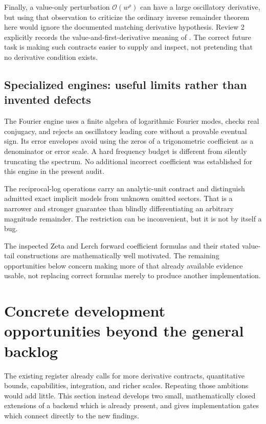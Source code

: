 \documentclass[11pt,a4paper]{article}
\newcommand{\code}[1]{\texttt{\detokenize{#1}}}
\newcommand{\OO}{\mathcal O}
\begin{document}
Finally, a value-only perturbation \(\OO(w^\rho)\) can have a large oscillatory derivative, but using that observation to criticize the ordinary inverse remainder theorem here would ignore the documented matching derivative hypothesis. Review 2 explicitly records the value-and-first-derivative meaning of \code{InputRemainder}. The correct future task is making such contracts easier to supply and inspect, not pretending that no derivative condition exists.\cite{r2}

\subsection{Specialized engines: useful limits rather than invented defects}
The Fourier engine uses a finite algebra of logarithmic Fourier modes, checks real conjugacy, and rejects an oscillatory leading core without a provable eventual sign. Its error envelopes avoid using the zeros of a trigonometric coefficient as a denominator or error scale. A hard frequency budget is different from silently truncating the spectrum. No additional incorrect coefficient was established for this engine in the present audit.\cite{fourier}

The reciprocal-log operations carry an analytic-unit contract and distinguish admitted exact implicit models from unknown omitted sectors. That is a narrower and stronger guarantee than blindly differentiating an arbitrary magnitude remainder. The restriction can be inconvenient, but it is not by itself a bug.\cite{reciprocal}

The inspected Zeta and Lerch forward coefficient formulas and their stated value-tail constructions are mathematically well motivated. The remaining opportunities below concern making more of that already available evidence usable, not replacing correct formulas merely to produce another implementation.\cite{dirichlet,dlmf-zeta,dlmf-lerch}

\section{Concrete development opportunities beyond the general backlog}

The existing register already calls for more derivative contracts, quantitative bounds, capabilities, integration, and richer scales. Repeating those ambitions would add little. This section instead develops two small, mathematically closed extensions of a backend which is already present, and gives implementation gates which connect directly to the new findings.\cite{status,dirichlet}
\end{document}
